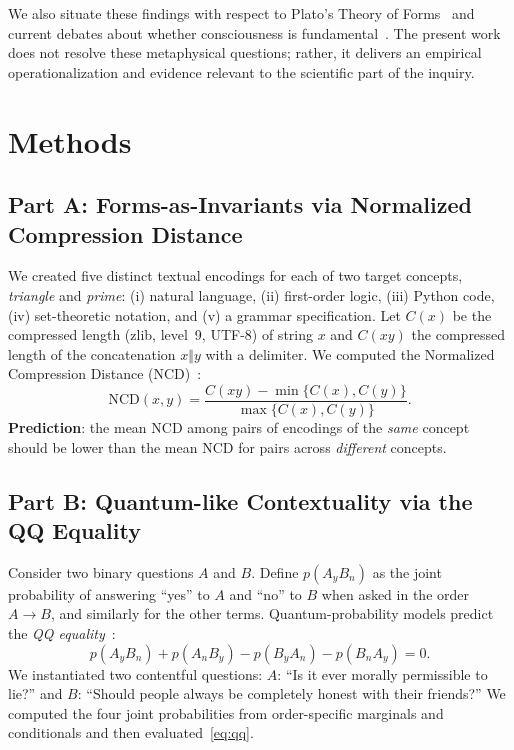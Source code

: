 \documentclass[11pt]{article}
\begin{document}
We also situate these findings with respect to Plato's Theory of Forms~\citep{PlatoCompleteWorks1997} and current debates about whether consciousness is fundamental~\citep{Goff2017,Oizumi2014IIT3,HameroffPenrose2014}. The present work does not resolve these metaphysical questions; rather, it delivers an empirical operationalization and evidence relevant to the scientific part of the inquiry.

\section{Methods}
\subsection{Part A: Forms-as-Invariants via Normalized Compression Distance}
We created five distinct textual encodings for each of two target concepts, \emph{triangle} and \emph{prime}: (i) natural language, (ii) first-order logic, (iii) Python code, (iv) set-theoretic notation, and (v) a grammar specification.
Let $C(x)$ be the compressed length (zlib, level~9, UTF-8) of string $x$ and $C(xy)$ the compressed length of the concatenation $x \Vert y$ with a delimiter. 
We computed the Normalized Compression Distance (NCD)~\citep{CilibrasiVitanyi2005}:
\begin{equation}
\mathrm{NCD}(x,y) = \frac{C(xy) - \min\{C(x),C(y)\}}{\max\{C(x),C(y)\}}.
\end{equation}
\textbf{Prediction}: the mean NCD among pairs of encodings of the \emph{same} concept should be lower than the mean NCD for pairs across \emph{different} concepts.

\subsection{Part B: Quantum-like Contextuality via the QQ Equality}
Consider two binary questions $A$ and $B$. 
Define $p(A_y B_n)$ as the joint probability of answering ``yes'' to $A$ and ``no'' to $B$ when asked in the order $A \rightarrow B$, and similarly for the other terms. 
Quantum-probability models predict the \emph{QQ equality}~\citep{Wang2014QQ}:
\begin{equation}
\label{eq:qq}
p(A_yB_n) + p(A_nB_y) - p(B_yA_n) - p(B_nA_y) = 0.
\end{equation}
We instantiated two contentful questions: 
$A$: ``Is it ever morally permissible to lie?'' and 
$B$: ``Should people always be completely honest with their friends?''
We computed the four joint probabilities from order-specific marginals and conditionals and then evaluated~\eqref{eq:qq}.
\end{document}
